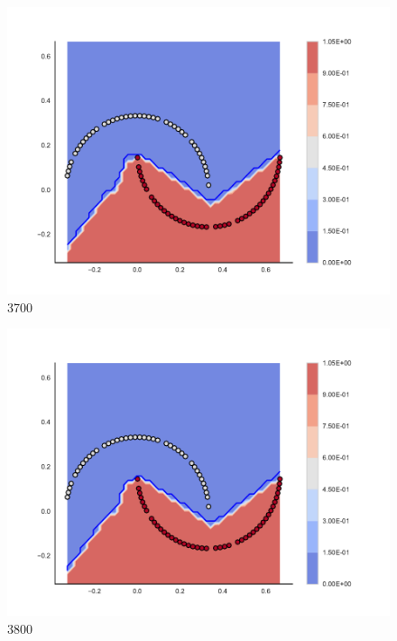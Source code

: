 \begin{subfigure}[b]{0.09\textwidth}
    \includegraphics[clip, trim=2.35cm 1.75cm 4.5cm 0cm,width=\textwidth]{img/convergence/3700.pdf}
    \caption{3700}
    \label{fig:convergence_3700}
\end{subfigure}
%
\begin{subfigure}[b]{0.09\textwidth}
    \includegraphics[clip, trim=2.35cm 1.75cm 4.5cm 0cm,width=\textwidth]{img/convergence/3800.pdf}
    \caption{3800}
    \label{fig:convergence_3800}
\end{subfigure}
%
